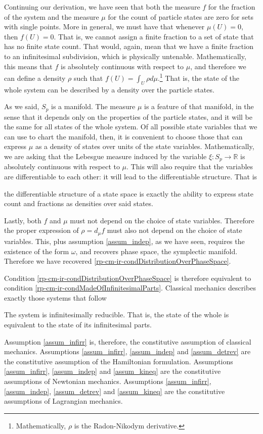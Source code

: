 Continuing our derivation, we have seen that both the measure $f$ for the fraction of the system and the measure $\mu$ for the count of particle states are zero for sets with single points. More in general, we must have that whenever $\mu(U) = 0$, then $f(U)=0$. That is, we cannot assign a finite fraction to a set of state that has no finite state count. That would, again, mean that we have a finite fraction to an infinitesimal subdivision, which is physically untenable. Mathematically, this means that $f$ is absolutely continuous with respect to $\mu$, and therefore we can define a density $\rho$ such that $f(U) = \int_U \rho d\mu$.\footnote{Mathematically, $\rho$ is the Radon-Nikodym derivative.} That is, the state of the whole system can be described by a density over the particle states.

As we said, $S_p$ is a manifold. The measure $\mu$ is a feature of that manifold, in the sense that it depends only on the properties of the particle states, and it will be the same for all states of the whole system. Of all possible state variables that we can use to chart the manifold, then, it is convenient to choose those that can express $\mu$ as a density of states over units of the state variables. Mathematically, we are asking that the Lebesgue measure induced by the variable $\xi : S_p \to \mathbb{R}$ is absolutely continuous with respect to $\mu$. This will also require that the variables are differentiable to each other: it will lead to the differentiable structure. That is
\begin{insight}
	the differentiable structure of a state space is exactly the ability to express state count and fractions as densities over said states.
\end{insight} 

Lastly, both $f$ and $\mu$ must not depend on the choice of state variables. Therefore the proper expression of $\rho = d_{\mu} f$ must also not depend on the choice of state variables. This, plus assumption \ref{assum_indep}, as we have seen, requires the existence of the form $\omega$, and recovers phase space, the symplectic manifold. Therefore we have recovered \ref{rp-cm-ir-condDistributionOverPhaseSpace}.

Condition \ref{rp-cm-ir-condDistributionOverPhaseSpace} is therefore equivalent to condition \ref{rp-cm-ir-condMadeOfInfinitesimalParts}. Classical mechanics describes exactly those systems that follow
\renewcommand{\theassump}{IR}
\begin{assump}\label{assum_infirr}
	The system is infinitesimally reducible. That is, the state of the whole is equivalent to the state of its infinitesimal parts.
\end{assump}
\renewcommand{\theassump}{\Roman{assump}}
Assumption \ref{assum_infirr} is, therefore, the constitutive assumption of classical mechanics. Assumptions \ref{assum_infirr}, \ref{assum_indep} and \ref{assum_detrev} are the constitutive assumption of the Hamiltonian formulation. Assumptions \ref{assum_infirr}, \ref{assum_indep} and \ref{assum_kineq} are the constitutive assumptions of Newtonian mechanics.  Assumptions \ref{assum_infirr}, \ref{assum_indep}, \ref{assum_detrev} and \ref{assum_kineq} are the constitutive assumptions of Lagrangian mechanics. 

